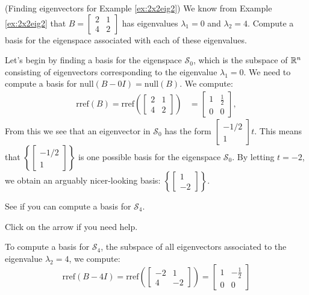 \documentclass{ximera}
\begin{document}
\begin{example}\label{ex:eigvectors2x2eig2} (Finding eigenvectors for Example \ref{ex:2x2eig2})
We know from Example \ref{ex:2x2eig2} that $B=\begin{bmatrix} 2& 1\\ 4&2
\end{bmatrix}$ has eigenvalues $\lambda_1=0$ and $\lambda_2=4$.  Compute a basis for the eigenspace associated with each of these eigenvalues.
\begin{explanation}
Let's begin by finding a basis for the eigenspace $\mathcal{S}_0$, which is the subspace of $\mathbb{R}^n$ consisting of eigenvectors corresponding to the eigenvalue $\lambda_1=0$.  We need to compute a basis for $\mbox{null}(B-0I) = \mbox{null}(B)$.  We compute:
\begin{align*}\mbox{rref}(B)=\mbox{rref}\left(\begin{bmatrix}2&1\\4&2\end{bmatrix}\right)&=\begin{bmatrix}1&\frac{1}{2}\\0&0\end{bmatrix},
\end{align*}
From this we see that an eigenvector in $\mathcal{S}_0$ has the form $\begin{bmatrix}-1/2\\1\end{bmatrix}t$. %
This means that $\left\{\begin{bmatrix}-1/2\\1\end{bmatrix}\right\}$ is one possible basis for the eigenspace $\mathcal{S}_0$.  By letting $t=-2$, we obtain an arguably nicer-looking basis: $\left\{\begin{bmatrix}1\\-2\end{bmatrix}\right\}$.
    
See if you can compute a basis for $\mathcal{S}_4$. 
    
Click on the arrow if you need help.
    
\begin{expandable}
To compute a basis for $\mathcal{S}_4$, the subspace of all eigenvectors associated to the eigenvalue $\lambda_2=4$, we compute:
$$\mbox{rref}(B-4I)=\mbox{rref}\left(\begin{bmatrix}-2&1\\4&-2\end{bmatrix}\right)=\begin{bmatrix}1&-\frac{1}{2}\\0&0\end{bmatrix}$$
\end{expandable}
    

\end{explanation}
\end{example}
\end{document}
